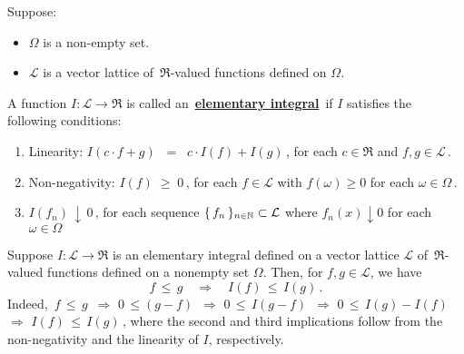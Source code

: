 
\begin{definition}
\mbox{}\vskip 0.1cm
\noindent
Suppose:
\begin{itemize}
\item
	$\Omega$ is a non-empty set.
\item
	$\mathcal{L}$ is a vector lattice of \,$\Re$-valued functions defined on $\Omega$.
\end{itemize}
A function $I : \mathcal{L} \longrightarrow \Re$ is called an \,\underline{\textbf{elementary integral}}\,
if $I$ satisfies the following conditions:
\begin{enumerate}
\item
	Linearity:\;\;
	$I(c \cdot f + g) \;\; = \;\; c \cdot I(f) + I(g)$\,,
	for each $c \in \Re$ and $f, g \in \mathcal{L}$\,.
\item
	Non-negativity:\;\; $I(f) \; \geq \; 0$\,,\;\;
	for each $f \in \mathcal{L}$ with $f(\omega) \geq 0$ for each $\omega \in \Omega$\,.
\item
	$I(f_{n}) \, \downarrow \, 0$\,,
	for each sequence $\{\,f_{n}\,\}_{n\in\mathbb{N}} \subset \mathcal{L}$ where $f_{n}(x) \downarrow 0$ for each $\omega \in \Omega$
\end{enumerate}
\end{definition}


\begin{remark}\label{ElementaryIntegralsPreserveInequalities}\quad
Suppose $I : \mathcal{L} \longrightarrow \Re$ is an elementary integral
defined on a vector lattice $\mathcal{L}$ of \,$\Re$-valued functions
defined on a nonempty set $\Omega$.
Then, for $f, g \in \mathcal{L}$, we have
\begin{equation*}
f \,\leq\, g \quad\Longrightarrow\quad I(f) \,\leq\, I(g)\,.
\end{equation*}
Indeed,\,
$f\,\leq\,g$
\,\;$\Longrightarrow$\; $0\,\leq (g-f)$
\,\;$\Longrightarrow$\; $0\,\leq\,I(g-f)$
\,\;$\Longrightarrow$\; $0\,\leq\,I(g)-I(f)$
\,\;$\Longrightarrow$\; $I(f) \,\leq\, I(g)$\,,
where the second and third implications follow from the non-negativity and the linearity of $I$, respectively.
\end{remark}


